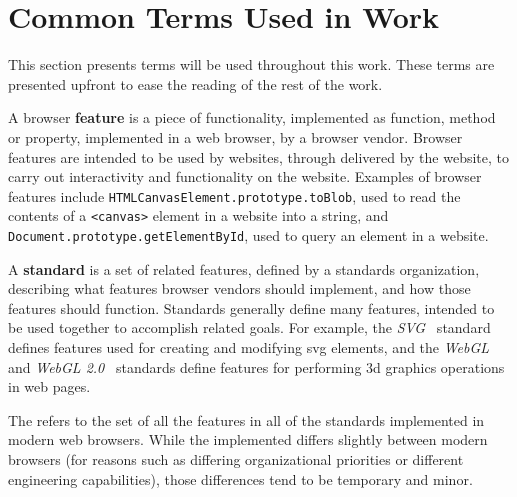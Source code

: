 \section{Common Terms Used in Work}
\label{intro:terms}

This section presents terms will be used throughout this work.  These terms are
presented upfront to ease the reading of the rest of the work.

A browser \textbf{feature} is a piece of functionality, implemented as
\JS function, method or property, implemented in a web browser, by a browser
vendor.  Browser features are intended to be used by websites, through
\JS delivered by the website, to carry out interactivity and functionality
on the website.  Examples of browser features include
\texttt{HTMLCanvasElement.prototype.toBlob}, used to read the contents of
a \texttt{<canvas>} element in a website into a string, and
\texttt{Document.prototype.getElementById}, used to query an element in a
website.

A \textbf{standard} is a set of related features, defined by a standards
organization, describing what features browser vendors should implement, and
how those features should function.  Standards generally define many features,
intended to be used together to accomplish related goals.  For example, the
\textit{SVG}~\cite{svg2011standard} standard defines features used for creating
and modifying \gls{svg} elements, and the \textit{WebGL}~\cite{webgl2015standard} and
\textit{WebGL 2.0}~\cite{webgl22018standard} standards define features
for performing 3d graphics operations in web pages.

The \textbf{\WAPI} refers to the set of all the features in all of the standards
implemented in modern web browsers. While the implemented \WAPI differs slightly
between modern browsers (for reasons such as differing organizational priorities
or different engineering capabilities), those differences tend to be temporary
and minor.
